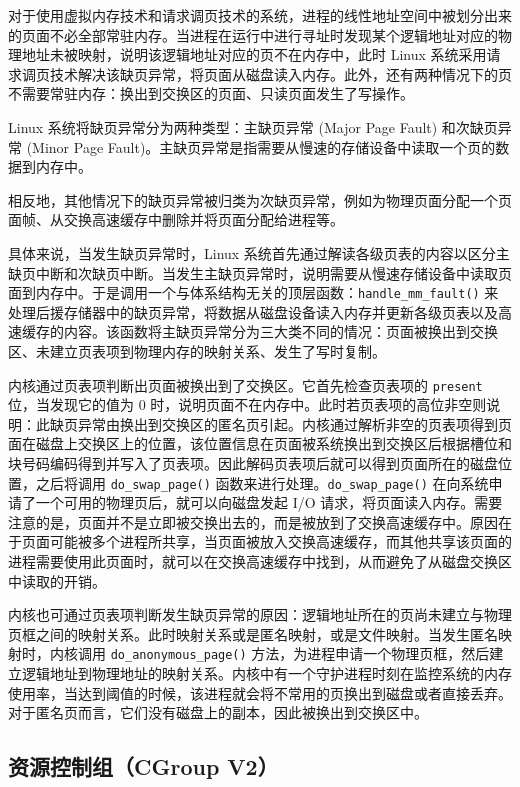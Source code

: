 对于使用虚拟内存技术和请求调页技术的系统，进程的线性地址空间中被划分出来的页面不必全部常驻内存。当进程在运行中进行寻址时发现某个逻辑地址对应的物理地址未被映射，说明该逻辑地址对应的页不在内存中，此时 Linux 系统采用请求调页技术解决该缺页异常，将页面从磁盘读入内存。此外，还有两种情况下的页不需要常驻内存：换出到交换区的页面、只读页面发生了写操作。

Linux 系统将缺页异常分为两种类型：主缺页异常 (Major Page Fault) 和次缺页异常 (Minor Page Fault)。主缺页异常是指需要从慢速的存储设备中读取一个页的数据到内存中。

相反地，其他情况下的缺页异常被归类为次缺页异常，例如为物理页面分配一个页面帧、从交换高速缓存中删除并将页面分配给进程等。

具体来说，当发生缺页异常时，Linux 系统首先通过解读各级页表的内容以区分主缺页中断和次缺页中断。当发生主缺页异常时，说明需要从慢速存储设备中读取页面到内存中。于是调用一个与体系结构无关的顶层函数：\texttt{handle\_mm\_fault()} 来处理后援存储器中的缺页异常，将数据从磁盘设备读入内存并更新各级页表以及高速缓存的内容。该函数将主缺页异常分为三大类不同的情况：页面被换出到交换区、未建立页表项到物理内存的映射关系、发生了写时复制。

内核通过页表项判断出页面被换出到了交换区。它首先检查页表项的 \texttt{present} 位，当发现它的值为 0 时，说明页面不在内存中。此时若页表项的高位非空则说明：此缺页异常由换出到交换区的匿名页引起。内核通过解析非空的页表项得到页面在磁盘上交换区上的位置，该位置信息在页面被系统换出到交换区后根据槽位和块号码编码得到并写入了页表项。因此解码页表项后就可以得到页面所在的磁盘位置，之后将调用 \texttt{do\_swap\_page()} 函数来进行处理。\texttt{do\_swap\_page()} 在向系统申请了一个可用的物理页后，就可以向磁盘发起 I/O 请求，将页面读入内存。需要注意的是，页面并不是立即被交换出去的，而是被放到了交换高速缓存中。原因在于页面可能被多个进程所共享，当页面被放入交换高速缓存，而其他共享该页面的进程需要使用此页面时，就可以在交换高速缓存中找到，从而避免了从磁盘交换区中读取的开销。

内核也可通过页表项判断发生缺页异常的原因：逻辑地址所在的页尚未建立与物理页框之间的映射关系。此时映射关系或是匿名映射，或是文件映射。当发生匿名映射时，内核调用 \texttt{do\_anonymous\_page()} 方法，为进程申请一个物理页框，然后建立逻辑地址到物理地址的映射关系。内核中有一个守护进程时刻在监控系统的内存使用率，当达到阈值的时候，该进程就会将不常用的页换出到磁盘或者直接丢弃。对于匿名页而言，它们没有磁盘上的副本，因此被换出到交换区中。

\subsection{资源控制组（CGroup V2）}


